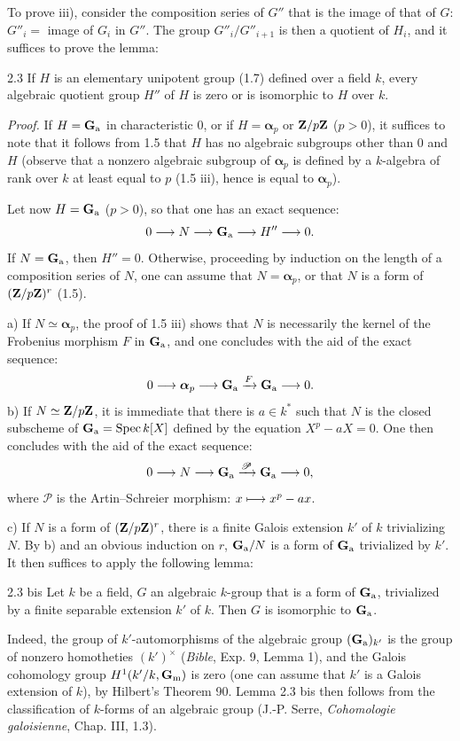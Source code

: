 To prove iii), consider the composition series of $G''$ that is the image of that of $G$: $G''_i=$ image of $G_i$ in $G''$. The group $G''_i/G''_{i+1}$ is then a quotient of $H_i$, and it suffices to prove the lemma:
\begin{lemma}{2.3}\label{XVII.2.3}
If $H$ is an elementary unipotent group (1.7) defined over a field $k$, every algebraic quotient group $H''$ of $H$ is zero or is isomorphic to $H$ over $k$.
\end{lemma}
\noindent\emph{Proof.} If $H=\mathbf{G}_{\mathrm{a}}$ in characteristic 0, or if $H=\boldsymbol\alpha_p$ or $\mathbf{Z}/p\mathbf{Z}$ ($p>0$), it suffices to note that it follows from 1.5 that $H$ has no algebraic subgroups other than 0 and $H$ (observe that a nonzero algebraic subgroup of $\boldsymbol\alpha_p$ is defined by a $k$-algebra of rank over $k$ at least equal to $p$ (1.5 iii), hence is equal to $\boldsymbol\alpha_p$).

Let now $H=\mathbf{G}_{\mathrm{a}}$ ($p>0$), so that one has an exact sequence:
\[
 0\longrightarrow N\longrightarrow\mathbf{G}_{\mathrm{a}}\longrightarrow H''\longrightarrow0.
\]
If $N=\mathbf{G}_{\mathrm{a}}$, then $H''=0$. Otherwise, proceeding by induction on the length of a composition series of $N$, one can assume that $N=\boldsymbol\alpha_p$, or that $N$ is a form of $(\mathbf{Z}/p\mathbf{Z})^r$ (1.5).

\noindent a) If $N\simeq\boldsymbol\alpha_p$, the proof of 1.5 iii) shows that $N$ is necessarily the kernel of the Frobenius morphism $F$ in $\mathbf{G}_{\mathrm{a}}$, and one concludes with the aid of the exact sequence:
\[
 0\longrightarrow\boldsymbol\alpha_p\longrightarrow\mathbf{G}_{\mathrm{a}}\xrightarrow{F}\mathbf{G}_{\mathrm{a}}\longrightarrow0.
\]
\noindent b) If $N\simeq\mathbf{Z}/p\mathbf{Z}$, it is immediate that there is $a\in k^*$ such that $N$ is the closed subscheme of $\mathbf{G}_{\mathrm{a}}=\operatorname{Spec} k[X]$ defined by the equation $X^p-aX=0$. One then concludes with the aid of the exact sequence:
\[
 0\longrightarrow N\longrightarrow\mathbf{G}_{\mathrm{a}}\xrightarrow{\mathscr P}\mathbf{G}_{\mathrm{a}}\longrightarrow0,
\]
where $\mathscr P$ is the Artin--Schreier morphism: $x\longmapsto x^p-ax$.

\noindent c) If $N$ is a form of $(\mathbf{Z}/p\mathbf{Z})^r$, there is a finite Galois extension $k'$ of $k$ trivializing $N$. By b) and an obvious induction on $r$, $\mathbf{G}_{\mathrm{a}}/N$ is a form of $\mathbf{G}_{\mathrm{a}}$ trivialized by $k'$. It then suffices to apply the following lemma:
\begin{lemma}{2.3 bis}\label{XVII.2.3bis}
Let $k$ be a field, $G$ an algebraic $k$-group that is a form of $\mathbf{G}_{\mathrm{a}}$, trivialized by a finite separable extension $k'$ of $k$. Then $G$ is isomorphic to $\mathbf{G}_{\mathrm{a}}$.
\end{lemma}

Indeed, the group of $k'$-automorphisms of the algebraic group $(\mathbf{G}_{\mathrm{a}})_{k'}$ is the group of nonzero homotheties $(k')^\times$ (\emph{Bible}, Exp. 9, Lemma 1), and the Galois cohomology group $H^1(k'/k,\mathbf{G}_{\mathrm{m}})$ is zero (one can assume that $k'$ is a Galois extension of $k$), by Hilbert's Theorem 90. Lemma 2.3 bis then follows from the classification of $k$-forms of an algebraic group (\cf J.-P. Serre, \emph{Cohomologie galoisienne}, Chap. III, 1.3).

